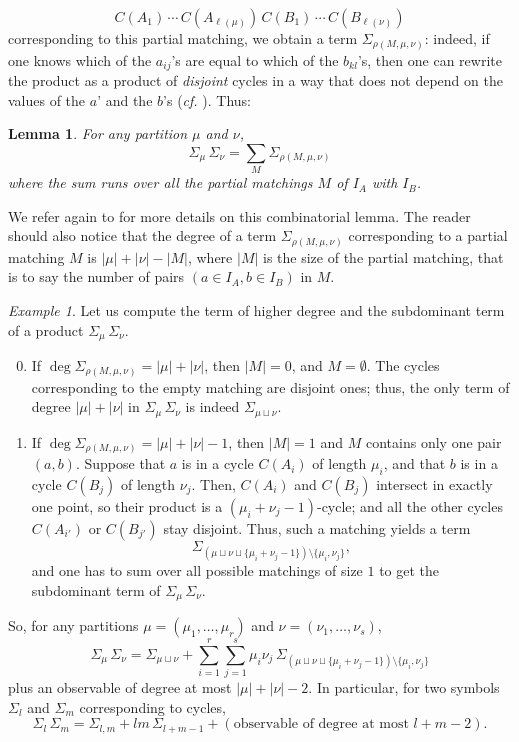 \documentclass[smallextended,nospthms]{svjour3}
\newtheorem{lemma}[theorem]{Lemma}
\theoremstyle{remark}
\newtheorem*{example}{Example}
\begin{document}
$$C(A_{1})\,\cdots \,C(A_{\ell(\mu)})\,C(B_{1})\,\cdots \,C(B_{\ell(\nu)})$$
corresponding to this partial matching, we obtain a term $\varSigma_{\rho(M,\mu,\nu)}$: indeed, if one knows which of the $a_{ij}$'s are equal to which of the $b_{kl}$'s, then one can rewrite the product as a product of \emph{disjoint} cycles in a way that does not depend on the values of the $a$' and the $b$'s (\emph{cf.} \cite[\S3.4]{FM10}). Thus: 
\begin{lemma}\label{matching}
For any partition $\mu$ and $\nu$,
$$\varSigma_{\mu}\,\varSigma_{\nu}=\sum_{M} \varSigma_{\rho(M,\mu,\nu)}$$
where the sum runs over all the partial matchings $M$ of $I_{A}$ with $I_{B}$.
\end{lemma}
\noindent We refer again to \cite{FM10} for more details on this combinatorial lemma. The reader should also notice that the degree of a term $\varSigma_{\rho(M,\mu,\nu)}$ corresponding to a partial matching $M$ is $|\mu|+|\nu|-|M|$, where $|M|$ is the size of the partial matching, that is to say the number of pairs $(a \in I_{A},b \in I_{B})$ in $M$.
\begin{example}
Let us compute the term of higher degree and the subdominant term of a product $\varSigma_{\mu}\,\varSigma_{\nu}$.\vspace{2mm}
\begin{enumerate}
\setcounter{enumi}{-1}
\item If $\deg \varSigma_{\rho(M,\mu,\nu)}=|\mu|+|\nu|$, then $|M|=0$, and $M=\emptyset$. The cycles corresponding to the empty matching are disjoint ones; thus, the only term of degree $|\mu|+|\nu|$ in $\varSigma_{\mu}\,\varSigma_{\nu}$ is indeed $\varSigma_{\mu \sqcup \nu}$. \vspace{2mm}
\item If $\deg \varSigma_{\rho(M,\mu,\nu)}=|\mu|+|\nu|-1$, then $|M|=1$ and $M$ contains only one pair $(a,b)$. Suppose that $a$ is in a cycle $C(A_{i})$ of length $\mu_{i}$, and that $b$ is in a cycle $C(B_{j})$ of length $\nu_{j}$. Then, $C(A_{i})$ and $C(B_{j})$ intersect in exactly one point, so their product is a $(\mu_{i}+\nu_{j}-1)$-cycle; and all the other cycles $C(A_{i'})$ or $C(B_{j'})$ stay disjoint. Thus, such a matching yields a term
$$\varSigma_{(\mu\sqcup \nu \sqcup \{\mu_{i}+\nu_{j}-1\})\setminus \{\mu_{i},\nu_{j}\} },$$
and one has to sum over all possible matchings of size $1$ to get the subdominant term of $\varSigma_{\mu}\,\varSigma_{\nu}$.
\end{enumerate}
So, for any partitions $\mu=(\mu_{1},\ldots,\mu_{r})$ and $\nu=(\nu_{1},\ldots,\nu_{s})$,
$$\varSigma_{\mu}\,\varSigma_{\nu}=\varSigma_{\mu \sqcup \nu}+\sum_{i=1}^{r}\sum_{j=1}^{s} \mu_{i}\nu_{j}\,\varSigma_{(\mu\sqcup \nu \sqcup \{\mu_{i}+\nu_{j}-1\})\setminus \{\mu_{i},\nu_{j}\} }$$
plus an observable of degree at most $|\mu|+|\nu|-2$. In particular, for two symbols $\varSigma_{l}$ and $\varSigma_{m}$ corresponding to cycles,
$$\varSigma_{l}\,\varSigma_{m}=\varSigma_{l,m}+lm\,\varSigma_{l+m-1}+(\text{observable of degree at most }l+m-2).$$
\end{example}
\end{document}
